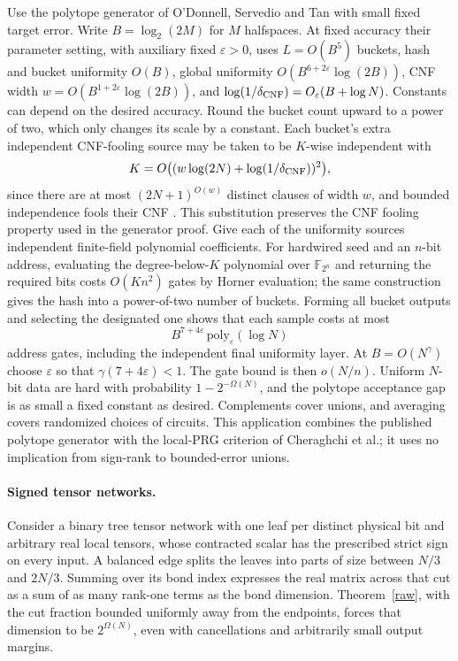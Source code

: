 \documentclass[11pt]{article}
\begin{document}
Use the polytope generator of O'Donnell, Servedio and Tan \cite[Definitions 4.1--4.2, Section 4.1, Remark 4.4]{ost} with small fixed target error. Write $B=\log_2(2M)$ for $M$ halfspaces. At fixed accuracy their parameter setting, with auxiliary fixed $\varepsilon>0$, uses $L=O(B^5)$ buckets, hash and bucket uniformity $O(B)$, global uniformity $O(B^{6+2\varepsilon}\log(2B))$, CNF width $w=O(B^{1+2\varepsilon}\log(2B))$, and $\log(1/\delta_{\rm CNF})=O_\varepsilon(B+\log N)$. Constants can depend on the desired accuracy. Round the bucket count upward to a power of two, which only changes its scale by a constant. Each bucket's extra independent CNF-fooling source may be taken to be $K$-wise independent with
\[
 K=O\big((w\log(2N)+\log(1/\delta_{\rm CNF}))^2\big),
\]
since there are at most $(2N+1)^{O(w)}$ distinct clauses of width $w$, and bounded independence fools their CNF \cite{bazzi}. This substitution preserves the CNF fooling property used in the generator proof. Give each of the uniformity sources independent finite-field polynomial coefficients. For hardwired seed and an $n$-bit address, evaluating the degree-below-$K$ polynomial over $\mathbb F_{2^n}$ and returning the required bits costs $O(Kn^2)$ gates by Horner evaluation; the same construction gives the hash into a power-of-two number of buckets. Forming all bucket outputs and selecting the designated one shows that each sample costs at most
\[
 B^{7+4\varepsilon}\,\mathrm{poly}_\varepsilon(\log N)
\]
address gates, including the independent final uniformity layer. At $B=O(N^\gamma)$ choose $\varepsilon$ so that $\gamma(7+4\varepsilon)<1$. The gate bound is then $o(N/n)$. Uniform $N$-bit data are hard with probability $1-2^{-\Omega(N)}$, and the polytope acceptance gap is as small a fixed constant as desired. Complements cover unions, and averaging covers randomized choices of circuits. This application combines the published polytope generator with the local-PRG criterion of Cheraghchi et al.; it uses no implication from sign-rank to bounded-error unions.

\paragraph{Signed tensor networks.}
Consider a binary tree tensor network with one leaf per distinct physical bit and arbitrary real local tensors, whose contracted scalar has the prescribed strict sign on every input. A balanced edge splits the leaves into parts of size between $N/3$ and $2N/3$. Summing over its bond index expresses the real matrix across that cut as a sum of as many rank-one terms as the bond dimension. Theorem~\ref{raw}, with the cut fraction bounded uniformly away from the endpoints, forces that dimension to be $2^{\Omega(N)}$, even with cancellations and arbitrarily small output margins.
\end{document}
